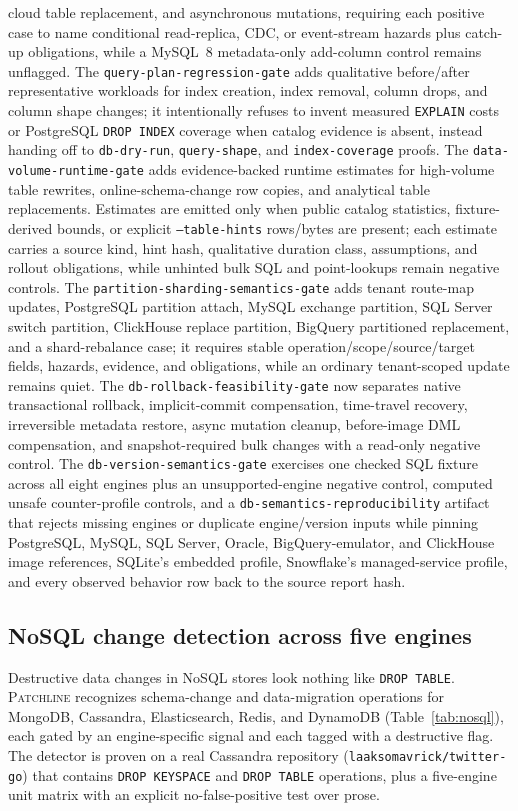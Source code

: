 \documentclass[11pt]{article}
\newcommand{\tool}{\textsc{Patchline}}
\newcommand{\code}[1]{\texttt{#1}}
\begin{document}
cloud table replacement, and asynchronous mutations, requiring each positive case to name conditional
read-replica, CDC, or event-stream hazards plus catch-up obligations, while a MySQL~8 metadata-only
add-column control remains unflagged. The
\code{query-plan-regression-gate} adds qualitative before/after representative workloads for index
creation, index removal, column drops, and column shape changes; it intentionally refuses to invent
measured \code{EXPLAIN} costs or PostgreSQL \code{DROP INDEX} coverage when catalog evidence is absent,
instead handing off to \code{db-dry-run}, \code{query-shape}, and \code{index-coverage} proofs. The
\code{data-volume-runtime-gate} adds evidence-backed runtime estimates for high-volume table rewrites,
online-schema-change row copies, and analytical table replacements. Estimates are emitted only when
public catalog statistics, fixture-derived bounds, or explicit \code{--table-hints} rows/bytes are
present; each estimate carries a source kind, hint hash, qualitative duration class, assumptions, and
rollout obligations, while unhinted bulk SQL and point-lookups remain negative controls. The
\code{partition-sharding-semantics-gate} adds tenant route-map updates, PostgreSQL partition attach,
MySQL exchange partition, SQL Server switch partition, ClickHouse replace partition, BigQuery
partitioned replacement, and a shard-rebalance case; it requires stable operation/scope/source/target
fields, hazards, evidence, and obligations, while an ordinary tenant-scoped update remains quiet. The
\code{db-rollback-feasibility-gate} now separates native transactional rollback, implicit-commit
compensation, time-travel recovery, irreversible metadata restore, async mutation cleanup, before-image
DML compensation, and snapshot-required bulk changes with a read-only negative control. The
\code{db-version-semantics-gate} exercises one checked SQL fixture across all eight engines plus an
unsupported-engine negative control, computed unsafe counter-profile controls, and a
\code{db-semantics-reproducibility} artifact that rejects missing engines or duplicate engine/version
inputs while pinning PostgreSQL, MySQL, SQL Server, Oracle, BigQuery-emulator, and ClickHouse image
references, SQLite's embedded profile, Snowflake's managed-service profile, and every observed
behavior row back to the source report hash.

\subsection{NoSQL change detection across five engines}
Destructive data changes in NoSQL stores look nothing like \code{DROP TABLE}. \tool{} recognizes
schema-change and data-migration operations for MongoDB, Cassandra, Elasticsearch, Redis, and
DynamoDB (Table~\ref{tab:nosql}), each gated by an engine-specific signal and each tagged with a
destructive flag. The detector is proven on a real Cassandra repository
(\code{laaksomavrick/twitter-go}) that contains \code{DROP KEYSPACE} and \code{DROP TABLE} operations,
plus a five-engine unit matrix with an explicit no-false-positive test over prose.
\end{document}
